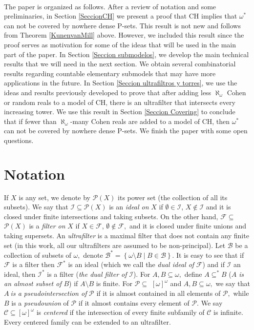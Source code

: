 \documentclass{article}%
\begin{document}
\ \ \ \ \qquad\qquad\qquad\ \ \ \qquad\ \ \ \ \ \ \qquad\ \ \ 

The paper is organized as follows. After a review of notation and some
preliminaries, in Section \ref{SeccionCH} we present a proof that \textsf{CH
}implies that $\omega^{\ast}$ can not be covered by nowhere dense
\textsf{P}-sets. This result is not new and follows from Theorem
\ref{KunenvanMill} above. However, we included this result since the proof
serves as motivation for some of the ideas that will be used in the main part
of the paper. In Section \ref{Seccion submodelos}, we develop the main
technical results that we will need in the next section. We obtain several
combinatorial results regarding countable elementary submodels that may have
more applications in the future. In Section
\ref{Seccion ultrafiltros y torres}, we use the ideas and results previously
developed to prove that after adding less $\aleph_{\omega}$ Cohen or random
reals to a model of \textsf{CH}, there is an ultrafilter that intersects every
increasing tower. We use this result in Section \ref{Seccion Covering} to
conclude that if fewer than $\aleph_{\omega}$-many Cohen reals are added to a
model of \textsf{CH}, then $\omega^{\ast}$ can not be covered by nowhere dense
\textsf{P}-sets. We finish the paper with some open questions.

\section{Notation}

If $X$ is any set, we denote by $\mathcal{P}\left(  X\right)  $ its power set
(the collection of all its subsets). We say that $\mathcal{I}\subseteq
\mathcal{P}\left(  X\right)  $ is an \emph{ideal on }$X$ if $\emptyset
\in\mathcal{I}$, $X\notin\mathcal{I}$ and it is closed under finite
intersections and taking subsets. On the other hand, $\mathcal{F\subseteq}$
$\mathcal{P}\left(  X\right)  $ is a \emph{filter on }$X$ if $X\in\mathcal{F}%
$, $\emptyset\notin\mathcal{F},$ and it is closed under finite unions and
taking supersets. An \emph{ultrafilter} is a maximal filter that does not
contain any finite set (in this work, all our ultrafilters are assumed to be
non-principal). Let $\mathcal{B}$ be a collection of subsets of $\omega,$
denote $\mathcal{B}^{\ast}=\left\{  \omega\setminus B\mid B\in\mathcal{B}%
\right\}  .$ It is easy to see that if $\mathcal{F}$ is a filter then
$\mathcal{F}^{\ast}$ is an ideal (which we call the \emph{dual ideal of
}$\mathcal{F}$) and if $\mathcal{I}$ an ideal, then $\mathcal{I}^{\ast}$ is a
filter (\emph{the dual filter of} $\mathcal{I}$). For $A,B\subseteq\omega,$
define $A\subseteq^{\ast}B$ ($A$ \emph{is an almost subset of} $B$) if
$A\setminus B$ is finite. For $\mathcal{P\subseteq}$ $\left[  \omega\right]
^{\omega}$ and $A,B\subseteq\omega,$ we say that $A\ $\emph{is a
pseudointersection of }$\mathcal{P}$ if it is almost contained in all elements
of $\mathcal{P},$ while $B$ is a \emph{pseudounion} of $\mathcal{P}$ if it
almost contains every element of $\mathcal{P}.$ We say $\mathcal{C}%
\subseteq\left[  \omega\right]  ^{\omega}$ is\emph{ centered} if the
intersection of every finite subfamily of $\mathcal{C}$ is infinite. Every
centered family can be extended to an ultrafilter.
\end{document}
